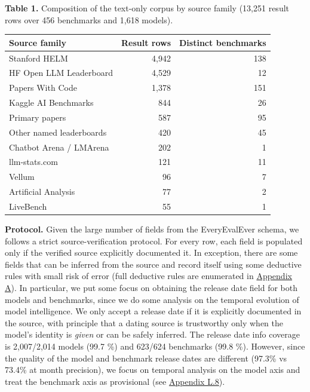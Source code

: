 \documentclass{article} %
\begin{document}
\textbf{Table 1.} Composition of the text-only corpus by source family (13,251 result rows over 456 benchmarks and 1,618 models).

\begin{longtable}[]{@{}lrr@{}}
\toprule\noalign{}
Source family & Result rows & Distinct benchmarks \\
\midrule\noalign{}
\endhead
\bottomrule\noalign{}
\endlastfoot
Stanford HELM & 4,942 & 138 \\
HF Open LLM Leaderboard & 4,529 & 12 \\
Papers With Code & 1,378 & 151 \\
Kaggle AI Benchmarks & 844 & 26 \\
Primary papers & 587 & 95 \\
Other named leaderboards & 420 & 45 \\
Chatbot Arena / LMArena & 202 & 1 \\
llm-stats.com & 121 & 11 \\
Vellum & 96 & 7 \\
Artificial Analysis & 77 & 2 \\
LiveBench & 55 & 1 \\
\end{longtable}

\textbf{Protocol.} Given the large number of fields from the EveryEvalEver schema, we follows a strict source-verification protocol. For every row, each field is populated only if the verified source
explicitly documented it. In exception, there are some fields that can be inferred from the source and record itself using some deductive rules with small risk of error (full deductive rules are
enumerated in \href{Appendix-Methods\#A\%20Data\%20sources\%20and\%20extraction}{Appendix A}). In particular, we put some focus on obtaining the release date field for both models and benchmarks,
since we do some analysis on the temporal evolution of model intelligence. We only accept a release date if it is explicitly documented in the source, with principle that a dating source is
trustworthy only when the model's identity is \emph{given} or can be safely inferred. The release date info coverage is 2,007/2,014 models (99.7 \%) and 623/624 benchmarks (99.8 \%). However, since
the quality of the model and benchmark release dates are different (97.3\% vs 73.4\% at month precision), we focus on temporal analysis on the model axis and treat the benchmark axis as provisional
(see \href{Appendix-Methods\#L\%20Known\%20limitations\%20and\%20deviations}{Appendix L.8}).
\end{document}
